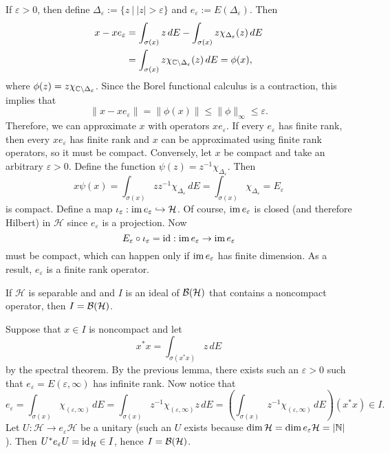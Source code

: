 \begin{myproof}
  If $\varepsilon > 0$, then define $\Delta_{\varepsilon} := \{z\ |\ |z| > \varepsilon\}$ and $e_\varepsilon := E(\Delta_\varepsilon)$.
  Then 
  \begin{align*}
    x - x e_\varepsilon &= \int_{\sigma(x)} z\, dE - \int_{\sigma(x)} z \chi_{\Delta_\varepsilon} (z)\, dE\\
    &= \int_{\sigma(x)} z \chi_{\mathbb {C} \setminus \Delta_\varepsilon} (z)\, dE = \phi (x),
  \end{align*}
  where $\phi (z) = z \chi_{\mathbb {C} \setminus \Delta_{\varepsilon}}$. 
  Since the Borel functional calculus is a contraction, this implies that $$\| x - x e_\varepsilon\| = \| \phi(x)\| \leq \|\phi\|_\infty \leq \varepsilon.$$
  Therefore, we can approximate $x$ with operators $x e_{\varepsilon}$. If every $e_{\varepsilon}$ has finite rank, then every $x e_\varepsilon$
  has finite rank and $x$ can be approximated using finite rank operators, so it must be compact.
  Conversely, let $x$ be compact and take an arbitrary $\varepsilon > 0$. Define the function $\psi (z) = z^{-1} \chi_{\Delta_\varepsilon}$.
  Then $$x \psi (x) = \int_{\sigma(x)} z z^{-1} \chi_{\Delta_\varepsilon} \, dE = \int_{\sigma(x)} \chi_{\Delta_\varepsilon} = E_\varepsilon$$
  is compact. Define a map $\iota_\varepsilon: {\operatorname{im} e_\varepsilon}\hookrightarrow \mathcal{H}$. Of course, $\operatorname{im} e_{\varepsilon}$ is closed (and therefore Hilbert) in $\mathcal{H}$ 
  since $e_\varepsilon$ is a projection.
  Now $$E_{\varepsilon} \circ \iota_\varepsilon = \operatorname{id} : {\operatorname{im} e_\varepsilon} \to {\operatorname{im}e_\varepsilon}$$
  must be compact, which can happen only if ${\operatorname{im} e_\varepsilon}$ has finite dimension. As a result, $e_\varepsilon$ is a finite rank operator.
\end{myproof}

\begin{corollary}\label{cor:6.1}
  If $\mathcal{H}$ is separable and and $I$ is an ideal of $\operatorname{\mathcal{B} (\mathcal{H})}$ that contains a noncompact operator, then $I = \operatorname{\mathcal{B} (\mathcal{H})}$.
\end{corollary}

\begin{myproof}
  Suppose that $x \in I$ is noncompact and let 
  $$x^* x = \int_{\sigma(x^* x)} z\, dE$$
  by the spectral theorem. By the previous lemma, there exists such an $\varepsilon > 0$ such that 
  $e_{\varepsilon} = E(\varepsilon, \infty)$ has infinite rank. Now notice that 
  $$e_\varepsilon = \int_{\sigma(x)} \chi_{(\varepsilon, \infty)}\, dE = \int_{\sigma(x)} z^{-1} \chi_{(\varepsilon, \infty)} z\, dE = \left(\int_{\sigma(x)} z^{-1} \chi_{(\varepsilon, \infty)}\, dE\right) (x^* x) \in I.$$
  Let $U: \mathcal{H}\to e_{\varepsilon} \mathcal{H}$ be a unitary (such an $U$ exists because $\dim \mathcal{H} = \dim e_\varepsilon \mathcal{H} = |\mathbb {N}|$).
  Then $U^* e_\varepsilon U = \operatorname{id}_{\mathcal{H}} \in I$, hence $I = \operatorname{\mathcal{B} (\mathcal{H})}$.
\end{myproof}

